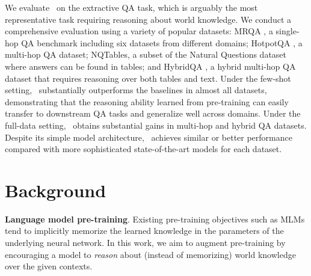 \documentclass[11pt]{article}
\newcommand{\nop}[1]{}
\newcommand{\ours}[0]{\text{ReasonBERT}}
\begin{document}
\nop{When finetuning for QA tasks, we append the \texttt{[QUESTION]} token to the question and get contextualized representations with the pre-trained encoder. To encourage the model to conduct deep reasoning, we include multiple pieces of evidence in the input, and scatter the answers among them to mimic different types of reasoning chains {(See Figure \ref{XX})}. To enable our model to handle both structured and unstructured data, we consider both tables and texts as evidence, and adopt the recent structure-aware transformer from TAPAS \cite{XX} to help the model understand table structure.
}

We evaluate \ours\ on the extractive QA task, which is arguably the most representative task requiring reasoning about world knowledge. \nop{When finetuning the models pre-trained by \ours\ for extractive QA, we append the \texttt{[QUESTION]} token to the question and get its contextualized representation from the pre-trained encoder.}  We conduct a comprehensive evaluation using a variety of popular datasets: MRQA \cite{fisch-etal-2019-mrqa}, a \nop{text-only} single-hop QA benchmark including six datasets from different domains; HotpotQA \cite{yang-etal-2018-hotpotqa}, a \nop{text-only} multi-hop QA dataset; NQTables, a subset of the Natural Questions dataset \cite{kwiatkowski-etal-2019-natural} where answers can be found in tables; and HybridQA \cite{chen-etal-2020-hybridqa}, a hybrid multi-hop QA dataset that requires reasoning over both tables and text. Under the few-shot setting, \ours\ substantially outperforms the baselines in almost all datasets, demonstrating that the reasoning ability learned from pre-training can easily transfer to downstream QA tasks and generalize well across domains. Under the full-data setting, \ours\ obtains substantial gains in multi-hop and hybrid QA datasets. Despite its simple model architecture, \ours\ achieves similar or better performance compared with more sophisticated state-of-the-art models for each dataset. \section{Background}
\label{sec:problem}
\nop{changing to the following flow:}

\noindent \textbf{Language model pre-training}. \nop{Effectiveness of Bert and SpanBert, but they tend to memorize world knowledge.} Existing pre-training objectives such as MLMs \cite{devlin-etal-2019-bert, joshi-etal-2020-spanbert} tend to implicitly memorize the learned knowledge in the parameters of the underlying neural network. In this work, we aim to augment pre-training by encouraging a model to \textit{reason} about (instead of memorizing) world knowledge over the given contexts. 
\end{document}
